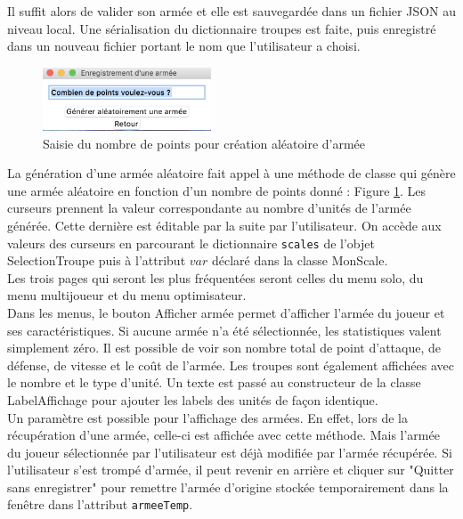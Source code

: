 \documentclass[a4paper]{article} %
\begin{document}
Il suffit alors de valider son armée et elle est sauvegardée dans un fichier JSON au niveau local. Une sérialisation du dictionnaire troupes est faite, puis enregistré dans un nouveau fichier portant le nom que l'utilisateur a choisi.
\\

\begin{figure}[!h]
	\begin{center}
	\includegraphics[width=5cm]{Images/pointsAleatoire.png} 
	\caption{Saisie du nombre de points pour création aléatoire d'armée\label{fig:pointsAleatoire}}
	\end{center}
\end{figure}

La génération d'une armée aléatoire fait appel à une méthode de classe qui génère une armée aléatoire en fonction d'un nombre de points donné : Figure \ref{fig:pointsAleatoire}. Les curseurs prennent la valeur correspondante au nombre d'unités de l'armée générée. Cette dernière est éditable par la suite par l'utilisateur. On accède aux valeurs des curseurs en parcourant le dictionnaire \texttt{scales} de l'objet SelectionTroupe puis à l'attribut $var$ déclaré dans la classe MonScale.\\

Les trois pages qui seront les plus fréquentées seront celles du menu solo, du menu multijoueur et du menu optimisateur.
\\
Dans les menus, le bouton Afficher armée permet d'afficher l'armée du joueur et ses caractéristiques. Si aucune armée n'a été sélectionnée, les statistiques valent simplement zéro. Il est possible de voir son nombre total de point d'attaque, de défense, de vitesse et le coût de l'armée. Les troupes sont également affichées avec le nombre et le type d'unité. Un texte est passé au constructeur de la classe LabelAffichage pour ajouter les labels des unités de façon identique. \\

Un paramètre est possible pour l'affichage des armées. En effet, lors de la récupération d'une armée, celle-ci est affichée avec cette méthode. Mais l'armée du joueur sélectionnée par l'utilisateur est déjà modifiée par l'armée récupérée. Si l'utilisateur s'est trompé d'armée, il peut revenir en arrière et cliquer sur "Quitter sans enregistrer" pour remettre l'armée d'origine stockée temporairement dans la fenêtre dans l'attribut \texttt{armeeTemp}.\\
\end{document}
